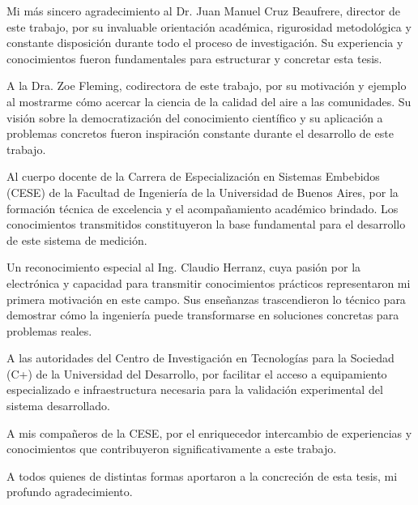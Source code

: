 \documentclass[
    11pt,
    spanish,
    singlespacing,
    parskip,
    headsepline,
    bookmarks=true,
    unicode=true,
    pdftoolbar=true,
    pdfmenubar=true,
    pdffitwindow=false,
    colorlinks=true,
    linkcolor=blue,
    citecolor=blue,
    urlcolor=blue
]{MastersDoctoralThesis}
\begin{document}
\begin{acknowledgements}
\vspace{1.5cm}

Mi más sincero agradecimiento al Dr. Juan Manuel Cruz Beaufrere, director de este trabajo, por su invaluable orientación académica, rigurosidad metodológica y constante disposición durante todo el proceso de investigación. Su experiencia y conocimientos fueron fundamentales para estructurar y concretar esta tesis.

A la Dra. Zoe Fleming, codirectora de este trabajo, por su motivación y ejemplo al mostrarme cómo acercar la ciencia de la calidad del aire a las comunidades. Su visión sobre la democratización del conocimiento científico y su aplicación a problemas concretos fueron inspiración constante durante el desarrollo de este trabajo.

Al cuerpo docente de la Carrera de Especialización en Sistemas Embebidos (CESE) de la Facultad de Ingeniería de la Universidad de Buenos Aires, por la formación técnica de excelencia y el acompañamiento académico brindado. Los conocimientos transmitidos constituyeron la base fundamental para el desarrollo de este sistema de medición.

Un reconocimiento especial al Ing. Claudio Herranz, cuya pasión por la electrónica y capacidad para transmitir conocimientos prácticos representaron mi primera motivación en este campo. Sus enseñanzas trascendieron lo técnico para demostrar cómo la ingeniería puede transformarse en soluciones concretas para problemas reales.

A las autoridades del Centro de Investigación en Tecnologías para la Sociedad (C+) de la Universidad del Desarrollo, por facilitar el acceso a equipamiento especializado e infraestructura necesaria para la validación experimental del sistema desarrollado.

A mis compañeros de la CESE, por el enriquecedor intercambio de experiencias y conocimientos que contribuyeron significativamente a este trabajo.

A todos quienes de distintas formas aportaron a la concreción de esta tesis, mi profundo agradecimiento.  

\end{acknowledgements}


\tableofcontents
\listoffigures
\listoftables
\end{document}
